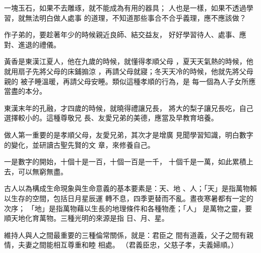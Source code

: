 \documentclass[avery5371,grid]{flashcards}
\begin{document}
{一塊玉石，如果不去雕琢，就不能成為有用的器具；
人也是一樣，如果不透過學習，就無法明白做人處事
的道理，不知道那些事合不合乎義理，應不應該做？} %
{} %


{作子弟的，要趁著年少的時候親近良師、結交益友，
好好學習待人、處事、應對、進退的禮儀。} %
{} %



{黃香是東漢江夏人，他在九歲的時候，就懂得孝順父母
，夏天天氣熱的時候，他就用扇子先將父母的床鋪搧涼
，再請父母就寢；冬天天冷的時候，他就先將父母親的
被子睡溫暖，再請父母安睡。類似這種孝順的行為，是
每一個為人子女所應當盡的本分。} %
{} %



{東漢末年的孔融，才四歲的時候，就曉得禮讓兄長，
將大的梨子讓兄長吃，自己選擇較小的。這種尊敬兄
長、友愛兄弟的美德，應當及早教育培養。} %
{} %





{做人第一重要的是孝順父母，友愛兄弟，其次才是增廣
見聞學習知識，明白數字的變化，並研讀古聖先賢的文
章，來修養自己。} %
{} %



{一是數字的開始，十個十是一百，十個一百是一千，
十個千是一萬，如此累積上去，可以無窮無盡。} %
{} %



{古人以為構成生命現象與生命意義的基本要素是：天、地
、人；「天」是指萬物賴以生存的空間，包括日月星辰運
轉不息，四季更替而不亂。晝夜寒暑都有一定的次序；
「地」是指萬物藉以生長的地理條件和各種物產；「人」
是萬物之靈，要順天地化育萬物。三種光明的來源是指
日、月、星。} %
{} %



{維持人與人之間最重要的三種倫常關係，就是：君臣之
間有道義，父子之間有親情，夫妻之間能相互尊重和睦
相處。} %
{（君義臣忠，父慈子孝，夫義婦順。）} %
\end{document}
